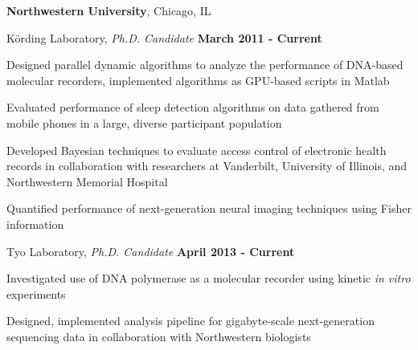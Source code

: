 \documentclass[10pt]{article}
\begin{document}
\textbf{Northwestern University},
Chicago, IL
\begin{outerlist}
\item[] K\"ording Laboratory, \textit{Ph.D. Candidate}
\hfill \textbf{March 2011 - Current}
	\begin{innerlist}
	\item Designed parallel dynamic algorithms to analyze the performance of DNA-based molecular recorders, implemented algorithms as GPU-based scripts in Matlab
	\item Evaluated performance of sleep detection algorithms on data gathered from mobile phones in a large, diverse participant population
	\item Developed Bayesian techniques to evaluate access control of electronic health records in collaboration with researchers at Vanderbilt, University of Illinois, and Northwestern Memorial Hospital
	\item Quantified performance of next-generation neural imaging techniques using Fisher information
	\end{innerlist}
		
\item[] Tyo Laboratory, \textit{Ph.D. Candidate}
\hfill \textbf{April 2013 - Current}
	\begin{innerlist}
	\item Investigated use of DNA polymerase as a molecular recorder using kinetic \textit{in vitro} experiments
	\item Designed, implemented analysis pipeline for gigabyte-scale next-generation sequencing data in collaboration with Northwestern biologists
	\end{innerlist}
	
%	
\end{outerlist}
\end{document}
